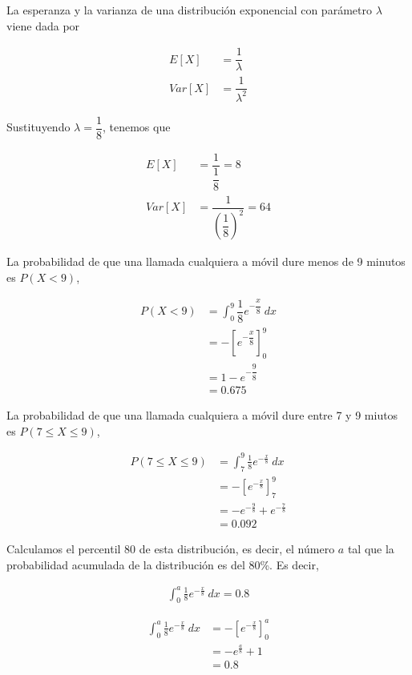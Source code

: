 \documentclass[12pt,a4paper,twoside,openright,titlepage,final]{article}
\begin{document}
La esperanza y la varianza de una distribución exponencial con parámetro $\lambda$ viene dada por

\begin{align*}
E[X] & = \dfrac{1}{\lambda} \\
Var[X] & = \dfrac{1}{\lambda^2}
\end{align*}

Sustituyendo $\lambda  = \dfrac{1}{8}$, tenemos que

\begin{align*}
E[X] & = \dfrac{1}{\dfrac{1}{8}} = 8 \\
Var[X] & = \dfrac{1}{\left(\dfrac{1}{8}\right)^2} = 64
\end{align*}

La probabilidad de que una llamada cualquiera a móvil dure menos de 9 minutos es $P(X < 9)$,

\begin{align*}
P(X < 9) & = \int_{0}^{9} \dfrac{1}{8} e^{-\dfrac{x}{8}} \ dx \\
& = -\left[ e^{-\dfrac{x}{8}} \right]_0^9 \\
& = 1 - e^{-\dfrac{9}{8}} \\
& = 0.675
\end{align*}

La probabilidad de que una llamada cualquiera a móvil dure entre 7 y 9 miutos es $P(7 \leq X \leq 9)$,

\begin{align*}
P(7 \leq X \leq 9) & = \int_{7}^{9} \frac{1}{8} e^{-\frac{x}{8}} \ dx \\
& = -\left[ e^{-\frac{x}{8}} \right]_7^9 \\
& = -e^{-\frac{9}{8}} + e^{-\frac{7}{8}} \\
& = 0.092
\end{align*}

Calculamos el percentil 80 de esta distribución, es decir, el número $a$ tal que la probabilidad acumulada de la distribución es del 80\%. Es decir,

\begin{align*}
\int_{0}^{a} \frac{1}{8} e^{-\frac{x}{8}} \ dx = 0.8
\end{align*}

\begin{align*}
\int_{0}^{a} \frac{1}{8} e^{-\frac{x}{8}} \ dx & = - \left[ e^{-\frac{x}{8}} \right]_0^a \\
& = -e^{\frac{a}{8}} + 1 \\
& = 0.8
\end{align*}
\end{document}
